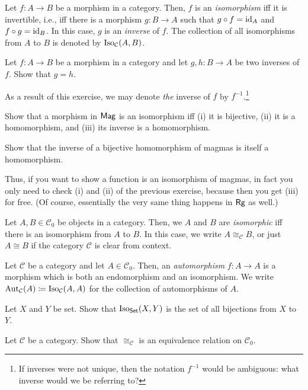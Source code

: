 \begin{dfn}[Isomorphism]\label{Isomorphism}
Let $f:A\rightarrow B$ be a morphism in a category.  Then, $f$ is an \emph{isomorphism} iff it is invertible, i.e., iff there is a morphism $g:B\rightarrow A$ such that $g\circ f=\operatorname{id} _A$ and $f\circ g=\operatorname{id} _B$.  In this case, $g$ is an \emph{inverse} of $f$.  The collection of all isomorphisms from $A$ to $B$ is denoted by $\operatorname{Iso} _{\mathcal{C}}(A,B)$.
\end{dfn}
\begin{exr}
Let $f:A\rightarrow B$ be a morphism in a category and let $g,h:B\rightarrow A$ be two inverses of $f$.  Show that $g=h$.
\begin{rmk}
As a result of this exercise, we may denote \emph{the} inverse of $f$ by $f^{-1}$.\footnote{If inverses were not unique, then the notation $f^{-1}$ would be ambiguous:  what inverse would we be referring to?}
\end{rmk}
\end{exr}
\begin{exr}
Show that a morphism in $\mathsf{Mag}$ is an isomorphism iff (i) it is bijective, (ii) it is a homomorphism, and (iii) its inverse is a homomorphism.
\end{exr}
\begin{exr}\label{exrA.2.11x}
Show that the inverse of a bijective homomorphism of magmas is itself a homomorphism.
\begin{rmk}
Thus, if you want to show a function is an isomorphism of magmas, in fact you only need to check (i) and (ii) of the previous exercise, because then you get (iii) for free.  (Of course, essentially the very same thing happens in $\mathsf{Rg}$ as well.)
\end{rmk}
\end{exr}
\begin{dfn}[Isomorphic]\label{dfnA.2.10}
Let $A,B\in \mathcal{C}_0$ be objects in a category.  Then, we $A$ and $B$ are \emph{isomorphic} iff there is an isomorphism from $A$ to $B$.  In this case, we write $A\cong _{\mathcal{C}}B$, or just $A\cong B$ if the category $\mathcal{C}$ is clear from context.
\end{dfn}
\begin{dfn}[Automorphisms]
Let $\mathcal{C}$ be a category and let $A\in \mathcal{C}_0$.  Then, an \emph{automorphism} $f:A\rightarrow A$ is a morphism which is both an endomorphism and an isomorphism.  We write $\operatorname{Aut} _{\mathcal{C}}(A)\coloneqq \operatorname{Iso} _{\mathcal{C}}(A,A)$ for the collection of automorphisms of $A$.
\end{dfn}
\begin{exr}\label{exr2.1.3}
Let $X$ and $Y$ be set.  Show that $\operatorname{Iso} _{\mathsf{Set}}(X,Y)$ is the set of all bijections from $X$ to $Y$.
\end{exr}
\begin{exr}\label{exrA.2.11}
Let $\mathcal{C}$ be a category.  Show that $\cong _{\mathcal{C}}$ is an equivalence relation on $\mathcal{C}_0$.
\end{exr}